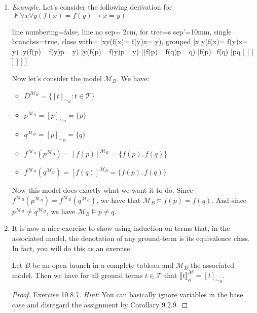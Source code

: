 \begin{enumerate}[\thesection.1]
	\item \emph{Example}. Let's consider the following derivation for $\nvdash \forall x\forall y(f(x)= f(y)\to x= y)$
	
	\begin{center}
	\begin{prooftree}
{
line numbering=false,
line no sep= 2cm,
for tree={s sep'=10mm},
single branches=true,
close with=\xmark
} 
[{\neg \forall x\forall y(f(x)= f(y)\to x= y)}, grouped
		[{\exists x \neg\forall y(f(x)= f(y)\to x= y)}
			[{\neg\forall y(f(p)= f(y)\to p= y)}
				[{\exists y\neg(f(p)= f(y)\to p= y)}
					[{\neg(f(p)= f(q)\to p= q)}
						[{f(p)=f(q)}
							[{p\neq q}
							]
						]
					]
				]
			]
		]
]
\end{prooftree}
\end{center}
Now let's consider the model $\mathcal{M}_{B}$. We have:
\begin{itemize}
		
			\item $D^{\mathcal{M}_B}=\{[t]_{\sim_B}:t\in\mathcal{T}\}$
			
			\item $p^{\mathcal{M}_B}=[p]_{\sim_B}=\{p\}$
			
			\item $q^{\mathcal{M}_B}=[p]_{\sim_B}=\{q\}$
			
			\item $f^{\mathcal{M}_B}(p^{\mathcal{M}_B})=[f(p)]^{\mathcal{M}_B}=\{f(p), f(q)\}$
			
			\item $f^{\mathcal{M}_B}(q^{\mathcal{M}_B})=[f(q)]^{\mathcal{M}_B}=\{f(p), f(q)\}$
			
	
		\end{itemize}
		Now this model does exactly what we want it to do. Since $f^{\mathcal{M}_B}(p^{\mathcal{M}_B})=f^{\mathcal{M}_B}(q^{\mathcal{M}_B})$, we have that $\mathcal{M}_B\vDash f(p)=f(q)$. And since $p^{\mathcal{M}_B}\neq q^{\mathcal{M}_B}$, we have $\mathcal{M}_B\vDash p\neq q$.
		
		\item It is now a nice exercise to show using induction on terms that, in the associated model, the denotation of any ground-term is its equivalence class. In fact, you will do this as an exercise \smiley
		
		\begin{lemma}
		Let $B$ be an open branch in a complete tableau and $\mathcal{M}_B$ the associated model. Then we have for all ground terms $t\in\mathcal{T}$ that $\llbracket t\rrbracket^\mathcal{M}_\alpha=[t]_{\sim_B}$. 	
		\end{lemma}
		\begin{proof}
		Exercise 10.8.7. \emph{Hint}: You can basically ignore variables in the base case and disregard the assignment by Corollary 9.2.9.
		\end{proof}
		
	\end{enumerate}


